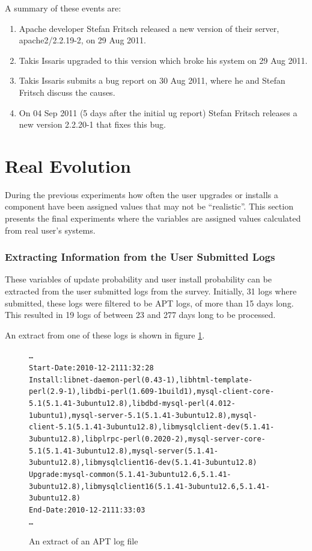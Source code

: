 A summary of these events are:
\begin{enumerate}
  \item Apache developer Stefan Fritsch released a new version of their server, apache2/2.2.19-2, on 29 Aug 2011.
  \item Takis Issaris upgraded to this version which broke his system on 29 Aug 2011.
  \item Takis Issaris submits a bug report on 30 Aug 2011, where he and Stefan Fritsch discuss the causes.
  \item On 04 Sep 2011 (5 days after the initial ug report) Stefan Fritsch releases a new version 2.2.20-1 that fixes this bug.
\end{enumerate}


\section{Real Evolution}
During the previous experiments how often the user upgrades or installs a component have been assigned values that may not be ``realistic''.
This section presents the final experiments where the variables are assigned values calculated from real user's systems.


\subsubsection{Extracting Information from the User Submitted Logs}
These variables of update probability and user install probability can be extracted from the user submitted logs from the survey.
Initially, 31 logs where submitted, these logs were filtered to be APT logs, of more than 15 days long.
This resulted in 19 logs of between 23 and 277 days long to be processed.

An extract from one of these logs is shown in figure \ref{aptlog}.
\begin{figure}[htp]
\begin{center}
\begin{alltt}
\ldots
Start-Date: 2010-12-21 11:32:28
Install: libnet-daemon-perl (0.43-1), libhtml-template-perl (2.9-1), libdbi-perl (1.609-1build1), mysql-client-core-5.1 (5.1.41-3ubuntu12.8), libdbd-mysql-perl (4.012-1ubuntu1), mysql-server-5.1 (5.1.41-3ubuntu12.8), mysql-client-5.1 (5.1.41-3ubuntu12.8), libmysqlclient-dev (5.1.41-3ubuntu12.8), libplrpc-perl (0.2020-2), mysql-server-core-5.1 (5.1.41-3ubuntu12.8), mysql-server (5.1.41-3ubuntu12.8), libmysqlclient16-dev (5.1.41-3ubuntu12.8)
Upgrade: mysql-common (5.1.41-3ubuntu12.6, 5.1.41-3ubuntu12.8), libmysqlclient16 (5.1.41-3ubuntu12.6, 5.1.41-3ubuntu12.8)
End-Date: 2010-12-21 11:33:03
\ldots
\end{alltt}
\caption[APT log extract]{An extract of an APT log file}
\label{aptlog}
\end{center}
\end{figure}

